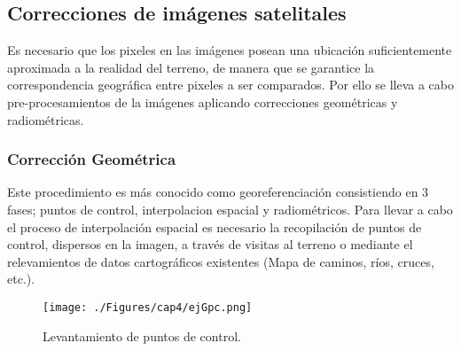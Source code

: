 \subsection{Correcciones de im\'agenes satelitales}\label{sec:coorImsat}
Es necesario que los pixeles en las im\'agenes posean una ubicaci\'on suficientemente aproximada a la realidad del terreno, de manera que se garantice la correspondencia geogr\'afica entre pixeles a ser comparados. Por ello se lleva a cabo pre-procesamientos de la im\'agenes aplicando correcciones geom\'etricas y radiom\'etricas.
\subsubsection{Correcci\'on Geom\'etrica}
Este procedimiento es m\'as conocido como georeferenciaci\'on consistiendo en 3 fases; puntos de control, interpolacion espacial y radiom\'etricos. Para llevar a cabo el proceso de interpolaci\'on espacial es necesario la recopilaci\'on de puntos de control, dispersos en la imagen, a trav\'es de visitas al terreno o mediante el relevamientos de datos cartogr\'aficos existentes (Mapa de caminos, ríos, cruces, etc.).
\begin{figure}[H]
	\centering
	\texttt{[image: ./Figures/cap4/ejGpc.png]}
	\caption{Levantamiento de puntos de control.}
	\label{fig:gcp}
\end{figure}

